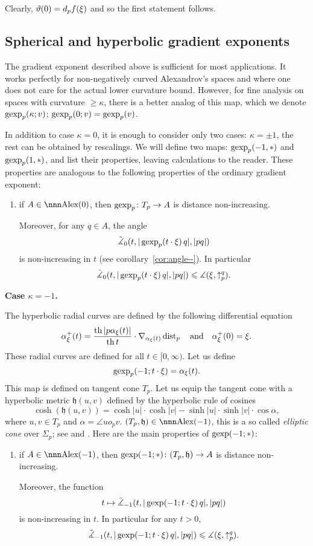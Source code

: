\documentclass{article}
\begin{document}
Clearly, $\vartheta(0)=d_p f(\xi)$ and so the first statement follows.\qeds






\subsection{Spherical and hyperbolic gradient exponents}\label{sph-hyp-exp}

The gradient exponent described above is sufficient for most applications. 
It works perfectly for non-negatively curved Alexandrov's spaces and 
where one does not care for the actual lower curvature bound.
However, for fine analysis on spaces with curvature $\ge \kappa$, there is a better
analog of this map, which we denote
$\operatorname{gexp}_p(\kappa;v)$; $\operatorname{gexp}_p(0;v)=\operatorname{gexp}_p(v)$.

In addition to case $\kappa=0$, it is enough to consider only two cases:
$\kappa=\pm1$, the rest can be obtained by rescalings. 
We will define two maps: $\operatorname{gexp}_p(-1,*)$ and  $\operatorname{gexp}_p(1,*)$, and list their
properties, leaving calculations to the reader. 
These properties are analogous to the following properties of the ordinary gradient
exponent:

\begin{enumerate}[$\diamond$]
\item if $A\in\Alex({0})$, then $\operatorname{gexp}_p\colon T_p\to A$ is distance non-increasing. 

Moreover, for any $q\in A$, the angle $$\tilde{\measuredangle}_{0}(t,|\operatorname{gexp}_p(t\cdot\xi)\,q|,|p q|)$$ is
non-increasing in $t$ (see corollary~\ref{cor:angle--}). In particular
$$\tilde{\measuredangle}_{0}(t,|\operatorname{gexp}_p(t\cdot\xi)\,q|,|p q|) \leqslant\measuredangle(\xi,\uparrow_p^q).$$
\end{enumerate}

\begin{thm}
{\bf Case $\kappa=-1$.}
\end{thm}
The hyperbolic radial curves are defined by the following differential equation
$$\alpha^+_\xi(t)=
\frac{\tanh|p\alpha_\xi(t)|}{\tanh t}\cdot\nabla_{\alpha_\xi(t)}\dist_p\ \ \
\text{and}\ \ \ \alpha^+_\xi(0)=\xi.$$
These radial curves are defined for all $t\in [0,\infty)$.
Let us define
$$\operatorname{gexp}_p(-1;t\cdot \xi)=\alpha_\xi(t).$$
This map is defined on tangent cone $T_p$.
Let us equip the tangent cone with a hyperbolic metric $\mathfrak h(u,v)$ defined by
the hyperbolic rule of cosines
$$\cosh(\mathfrak h(u,v)) 
=\cosh|u|\cdot\cosh|v|-\sinh|u|\cdot\sinh|v|\cdot\cos\alpha,$$
where $u,v\in T_p$ and $\alpha=\angle u o_p v$.
$(T_p,\mathfrak h)\in\Alex(-1)$, this is a so called \emph{elliptic cone} over $\Sigma_p$; 
see \cite[4.3.2]{BGP} and \cite{alexander-bishop:worps}.
Here are the main properties of $\operatorname{gexp}(-1;*)$:
\begin{enumerate}[$\diamond$]
\item if $A\in\Alex(-1)$, then $\operatorname{gexp}(-1;*)\colon(T_p,\mathfrak h)\to A$ is distance
non-increasing. 

Moreover, the function 
$$t\mapsto \tilde{\measuredangle}_{-1}(t,|\operatorname{gexp}(-1;t\cdot\xi )\,q|,|p q|)$$ 
is non-increasing in $t$. 
In particular for any $t>0$, $$\tilde{\measuredangle}_{-1}(t,|\operatorname{gexp}(-1;t\cdot\xi )\,q|,|p
q|)\leqslant \measuredangle(\xi,\uparrow_p^q).$$
\end{enumerate}
\end{document}
